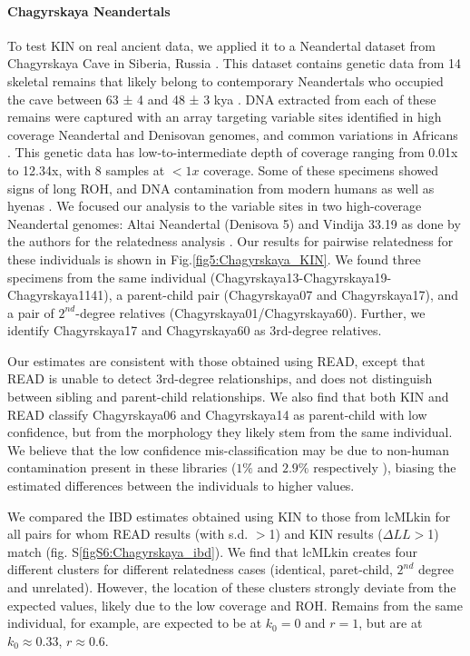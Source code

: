 \documentclass[12pt, letterpaper]{article}
\begin{document}
\paragraph{Chagyrskaya Neandertals}
To test KIN on real ancient data, we applied it to a Neandertal dataset from Chagyrskaya Cave in Siberia, Russia \cite{kolobova_archaeological_2020-1, mafessoni_high-coverage_2020,laurits_skov_genetic_nodate}. This dataset contains genetic data from  14 skeletal remains that likely belong to contemporary Neandertals who occupied the cave between 63 ± 4 and 48 ± 3 kya \cite{laurits_skov_genetic_nodate}. DNA extracted from each of these remains were captured with an array targeting variable sites identified in high coverage Neandertal and Denisovan genomes, and common variations in Africans \cite{laurits_skov_genetic_nodate}. This genetic data has  low-to-intermediate depth of coverage ranging from 0.01x to 12.34x, with 8 samples at  $<1x$ coverage. Some of these specimens showed signs of long ROH, and DNA contamination from modern humans as well as hyenas \cite{laurits_skov_genetic_nodate}. We focused our analysis to the variable sites in two high-coverage Neandertal genomes: Altai Neandertal (Denisova 5) \cite{prufer_complete_2014} and Vindija 33.19 \cite{prufer_high-coverage_2017} as done by the authors for the relatedness analysis \cite{laurits_skov_genetic_nodate}. Our results for pairwise relatedness for these individuals is shown in Fig.\ref{fig5:Chagyrskaya_KIN}. We found three specimens from the same  individual (Chagyrskaya13-Chagyrskaya19-Chagyrskaya1141), a parent-child pair (Chagyrskaya07 and Chagyrskaya17), and a pair of  $2^{nd}$-degree relatives (Chagyrskaya01/Chagyrskaya60). Further, we identify Chagyrskaya17 and Chagyrskaya60 as 3rd-degree relatives. 

Our estimates are consistent with those obtained using READ, except that READ is unable to detect 3rd-degree relationships, and does not distinguish between sibling and parent-child relationships. We also find that both KIN and READ classify Chagyrskaya06 and Chagyrskaya14 as parent-child with low confidence, but from the morphology they likely stem from the same individual. We believe that the low confidence mis-classification may be due to non-human contamination present in these libraries ($1\%$ and $2.9\%$ respectively \cite{laurits_skov_genetic_nodate}), biasing the estimated differences between the individuals to higher values.

We compared the IBD estimates obtained using KIN to those from lcMLkin for all pairs for whom READ results (with s.d. $>$1) and KIN results ($\Delta LL>$1) match (fig. S\ref{figS6:Chagyrskaya_ibd}). We find that lcMLkin creates four different clusters for different relatedness cases (identical, paret-child, $2^{nd}$ degree and unrelated). However, the location of these clusters strongly deviate from the expected values, likely due to the low coverage and ROH. Remains from the same individual, for example, are expected to be at $k_0 = 0$ and $r = 1$, but are at $k_0 \approx 0.33$, $r \approx 0.6$.
\end{document}
